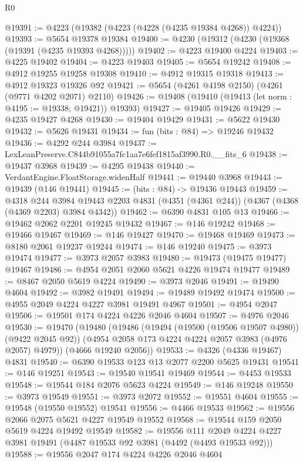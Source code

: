 \begin{lexlean}{R0}
\begin{coremodule}
@19391 := @4223 (@19382 (@4223 (@4228 (@4235 @19384 @4268)) @4224))
@19393 := @5654 @19378 @19384
@19400 := @4230 (@19312 (@4230 (@19368 (@19391 (@4235 @19393 @4268)))))
@19402 := @4223 @19400 @4224
@19403 := @4225 @19402
@19404 := @4223 @19403
@19405 := @5654 @19242
@19408 := @4912 @19255 @19258 @19308
@19410 := @4912 @19315 @19318
@19413 := @4912 @19323 @19326 @92
@19421 := @5654 (@4261 @4198 @2150) (@4261 (@9771 @4202 @2071) @2110)
@19426 := @19408 (@19410 (@19413 (let norm : @4195 := @19338; @19421)) @19393)
@19427 := @19405 @19426
@19429 := @4235 @19427 @4268
@19430 := @19404 @19429
@19431 := @5622 @19430
@19432 := @5626 @19431
@19434 := fun (bits : @84) => @19246 @19432
@19436 := @4292 @244 @3984
@19437 := LexLeanPreserve.C844b91055a7fc1aa7e6fef1815af3990.R0.__fits_6
@19438 := @19437 @3968
@19439 := @4295 @19438
@19440 := VerdantEngine.FloatStorage.widenHalf
@19441 := @19440 @3968
@19443 := @19439 (@146 @19441)
@19445 := (bits : @84) -> @19436 @19443
@19459 := @4318
    @244
    @3984
    @19443
    @2203
    @4831
    (@4351 (@4361 @244))
    (@4367 (@4368 (@4369 @2203) @3984 @4342))
@19462 := @6390 @4831 @105 @13
@19466 := @19462 @2062 @2201 @19245 @19432
@19467 := @146 @19242
@19468 := @19466 @19467
@19469 := @146 @19427
@19470 := @19468 @19469
@19473 := @8180 @2061 @19237 @19244
@19474 := @146 @19240
@19475 := @3973 @19474
@19477 := @3973 @2057 @3983
@19480 := @19473 (@19475 @19477) @19467
@19486 := @4954 @2051 @2060 @5621 @4226 @19474 @19477
@19489 := @8467 @2050 @5619 @4224
@19490 := @3973 @2046
@19491 := @19490 @4604
@19492 := @3982 @19491
@19494 := @19489 @19492 @19474
@19500 := @4955 @2049 @4224 @4227 @3981 @19491 @4967
@19501 := @4954 @2047
@19506 := @19501 @174 @4224 @4226 @2046 @4604
@19507 := @4976 @2046
@19530 := @19470
    (@19480
      (@19486
        (@19494 (@19500 (@19506 @19507 @4980)) (@9422 @2045 @92))
        (@4954 @2058 @173 @4224 @4224 @2057 @3983 (@4976 @2057) @4979))
      (@4666 @19240 @2056))
@19533 := @4326 (@4336 @19467) @4831
@19540 := @6390 @19533 @123 @13 @2077 @2200 @5625 @19431
@19541 := @146 @19251
@19543 := @19540 @19541 @19469
@19544 := @4453 @19533
@19548 := @19544 @184 @2076 @5623 @4224
@19549 := @146 @19248
@19550 := @3973 @19549
@19551 := @3973 @2072
@19552 := @19551 @4604
@19555 := @19548 (@19550 @19552) @19541
@19556 := @4466 @19533
@19562 := @19556 @2066 @2075 @5621 @4227 @19549 @19552
@19568 := @19544 @159 @2050 @5619 @4224 @19492 @19549
@19582 := @19556
    @111
    @2049
    @4224
    @4227
    @3981
    @19491
    (@4487 @19533 @92 @3981 (@4492 (@4493 @19533 @92)))
@19588 := @19556 @2047 @174 @4224 @4226 @2046 @4604

\end{coremodule}
\end{lexlean}
